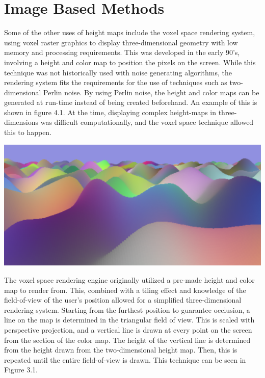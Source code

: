 \documentclass[10pt]{report}
\begin{document}
	\vspace{10pt}
	\let\clearpage\relax
	\chapter{Image Based Methods}
	
		Some of the other uses of height maps include the voxel space rendering system, using voxel raster graphics to display three-dimensional geometry with low memory and processing requirements. This was developed in the early 90's, involving a height and color map to position the pixels on the screen. While this technique was not historically used with noise generating algorithms, the rendering system fits the requirements for the use of techniques such as two-dimensional Perlin noise. By using Perlin noise, the height and color maps can be generated at run-time instead of being created beforehand. An example of this is shown in figure 4.1. At the time, displaying complex height-maps in three-dimensions was difficult computationally, and the voxel space technique allowed this to happen. 
		
		\begin{minipage}{\textwidth}
			\centering
			\includegraphics[scale=.15]{proc-voxel}
			\label{fig:fig14}
		\end{minipage}
		
		The voxel space rendering engine originally utilized a pre-made height and color map to render from. This, combined with a tiling effect and knowledge of the field-of-view of the user's position allowed for a simplified three-dimensional rendering system. Starting from the furthest position to guarantee occlusion, a line on the map is determined in the triangular field of view. This is scaled with perspective projection, and a vertical line is drawn at every point on the screen from the section of the color map. The height of the vertical line is determined from the height drawn from the two-dimensional height map. Then, this is repeated until the entire field-of-view is drawn. This technique can be seen in Figure 3.1. 
		
\end{document}
